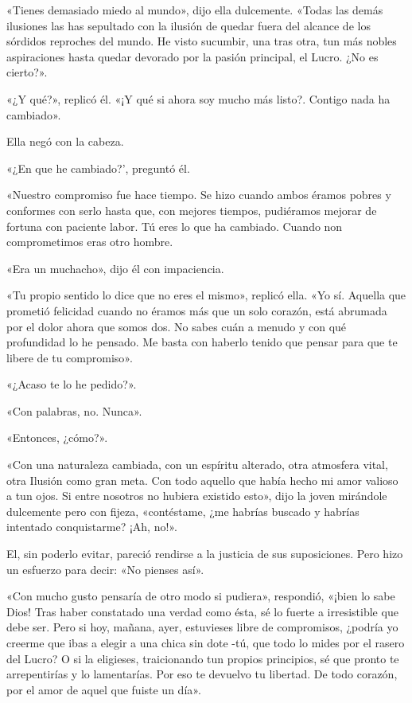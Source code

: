 \documentclass{novela}
\begin{document}
 «Tienes demasiado miedo al mundo», dijo ella dulcemente. «Todas las demás ilusiones las has sepultado con la ilusión de quedar fuera del alcance de los sórdidos reproches del mundo. He visto sucumbir, una tras otra, tun más nobles aspiraciones hasta quedar devorado por la pasión principal, el Lucro. ¿No es cierto?».

 «¿Y qué?», replicó él. «¡Y qué si ahora soy mucho más listo?. Contigo nada ha cambiado».

 Ella negó con la cabeza.

 «¿En que he cambiado?', preguntó él.

 «Nuestro compromiso fue hace tiempo. Se hizo cuando ambos éramos pobres y conformes con serlo hasta que, con mejores tiempos, pudiéramos mejorar de fortuna con paciente labor. Tú eres lo que ha cambiado. Cuando non comprometimos eras otro hombre.

 «Era un muchacho», dijo él con impaciencia.

 «Tu propio sentido lo dice que no eres el mismo», replicó ella. «Yo sí. Aquella que prometió felicidad cuando no éramos más que un solo corazón, está abrumada por el dolor ahora que somos dos. No sabes cuán a menudo y con qué profundidad lo he pensado. Me basta con haberlo tenido que pensar para que te libere de tu compromiso».

 «¿Acaso te lo he pedido?».

 «Con palabras, no. Nunca».

 «Entonces, ¿cómo?».

 «Con una naturaleza cambiada, con un espíritu alterado, otra atmosfera vital, otra Ilusión como gran meta. Con todo aquello que había hecho mi amor valioso a tun ojos. Si entre nosotros no hubiera existido esto», dijo la joven mirándole dulcemente pero con fijeza, «contéstame, ¿me habrías buscado y habrías intentado conquistarme? ¡Ah, no!».

 El, sin poderlo evitar, pareció rendirse a la justicia de sus suposiciones. Pero hizo un esfuerzo para decir: «No pienses así».

 «Con mucho gusto pensaría de otro modo si pudiera», respondió, «¡bien lo sabe Dios! Tras haber constatado una verdad como ésta, sé lo fuerte a irresistible que debe ser. Pero si hoy, mañana, ayer, estuvieses libre de compromisos, ¿podría yo creerme que ibas a elegir a una chica sin dote -tú, que todo lo mides por el rasero del Lucro? O si la eligieses, traicionando tun propios principios, sé que pronto te arrepentirías y lo lamentarías. Por eso te devuelvo tu libertad. De todo corazón, por el amor de aquel que fuiste un día».
\end{document}
